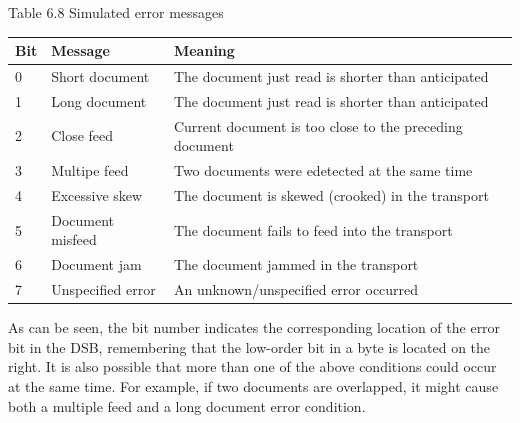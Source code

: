 \documentclass[10pt]{book}
\begin{document}
\begin{center}
\begin{center}
Table 6.8 Simulated error messages

\begin{center}
\begin{tabular}{|lll|}
\hline
Bit & Message & Meaning \\
\hline
0 & Short document & The document just read is shorter than anticipated \\
1 & Long document & The document just read is shorter than anticipated \\
2 & Close feed & Current document is too close to the preceding document \\
3 & Multipe feed & Two documents were edetected at the same time \\
4 & Excessive skew & The document is skewed (crooked) in the transport \\
5 & Document misfeed & The document fails to feed into the transport \\
6 & Document jam & The document jammed in the transport \\
7 & Unspecified error & An unknown/unspecified error occurred \\
\hline
\end{tabular}
\end{center}

As can be seen, the bit number indicates the corresponding location of the error bit in the DSB, remembering that the low-order bit in a byte is located on the right. It is also possible that more than one of the above conditions could occur at the same time. For example, if two documents are overlapped, it might cause both a multiple feed and a long document error condition.


\end{center}
\end{center}
\end{document}
